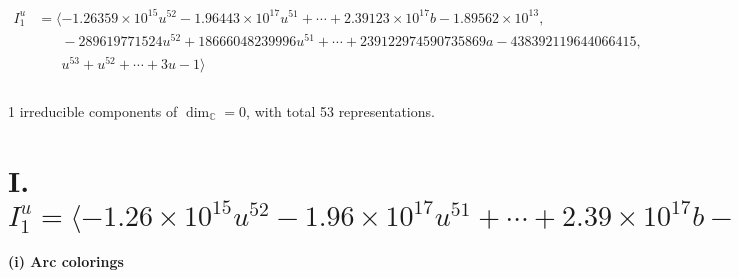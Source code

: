 \documentclass[1p]{elsarticle_modified}
\theoremstyle{definition}
\begin{document}
\begin{align*}
I^u_{1}&=\langle 
-1.26359\times10^{15} u^{52}-1.96443\times10^{17} u^{51}+\cdots+2.39123\times10^{17} b-1.89562\times10^{13},\\
\phantom{I^u_{1}}&\phantom{= \langle  }-289619771524 u^{52}+18666048239996 u^{51}+\cdots+239122974590735869 a-438392119644066415,\\
\phantom{I^u_{1}}&\phantom{= \langle  }u^{53}+u^{52}+\cdots+3 u-1\rangle \\
\\
\end{align*}
\raggedright * 1 irreducible components of $\dim_{\mathbb{C}}=0$, with total 53 representations.\\
\newpage
\renewcommand{\arraystretch}{1}
\centering \section*{I. $I^u_{1}= \langle -1.26\times10^{15} u^{52}-1.96\times10^{17} u^{51}+\cdots+2.39\times10^{17} b-1.90\times10^{13},\;-2.90\times10^{11} u^{52}+1.87\times10^{13} u^{51}+\cdots+2.39\times10^{17} a-4.38\times10^{17},\;u^{53}+u^{52}+\cdots+3 u-1 \rangle$}
\flushleft \textbf{(i) Arc colorings}\\
\end{document}
